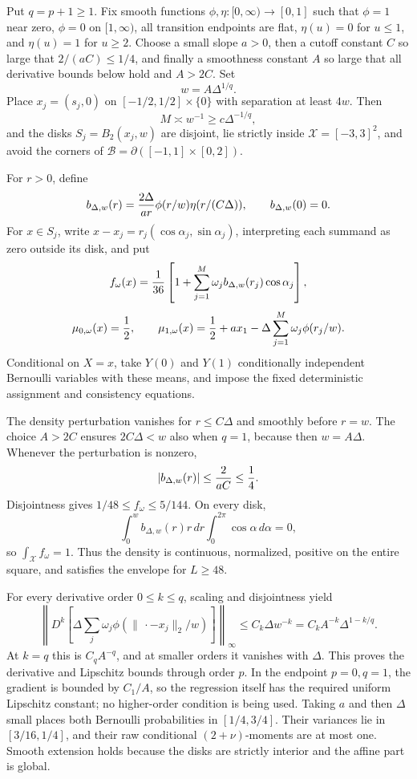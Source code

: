 Put \(q=p+1\geq1\).  Fix smooth functions \(\phi,\eta:[0,\infty)\to[0,1]\) such that \(\phi=1\) near zero, \(\phi=0\) on \([1,\infty)\), all transition endpoints are flat, \(\eta(u)=0\) for \(u\leq1\), and \(\eta(u)=1\) for \(u\geq2\).  Choose a small slope \(a>0\), then a cutoff constant \(C\) so large that \(2/(aC)\leq1/4\), and finally a smoothness constant \(A\) so large that all derivative bounds below hold and \(A>2C\).  Set
\[
 w=A\Delta^{1/q}.
\]
Place \(x_j=(s_j,0)\) on \([-1/2,1/2]\times\{0\}\) with separation at least \(4w\).  Then
\[
 M\asymp w^{-1}\geq c\Delta^{-1/q},
\]
and the disks \(S_j=B_2(x_j,w)\) are disjoint, lie strictly inside \(\mathcal X=[-3,3]^2\), and avoid the corners of \(\mathcal B=\partial([-1,1]\times[0,2])\).

For \(r>0\), define
\[
 b_{\Delta,w}(r)={2\Delta\over ar}\phi(r/w)\eta(r/(C\Delta)),
 \qquad b_{\Delta,w}(0)=0.
\]
For \(x\in S_j\), write \(x-x_j=r_j(\cos\alpha_j,\sin\alpha_j)\), interpreting each summand as zero outside its disk, and put
\[
 f_\omega(x)={1\over36}\left[1+\sum_{j=1}^M\omega_jb_{\Delta,w}(r_j)\cos\alpha_j\right],
\]
\[
 \mu_{0,\omega}(x)={1\over2},
 \qquad
 \mu_{1,\omega}(x)={1\over2}+ax_1-\Delta\sum_{j=1}^M\omega_j\phi(r_j/w).
\]
Conditional on \(X=x\), take \(Y(0)\) and \(Y(1)\) conditionally independent Bernoulli variables with these means, and impose the fixed deterministic assignment and consistency equations.

The density perturbation vanishes for \(r\leq C\Delta\) and smoothly before \(r=w\).  The choice \(A>2C\) ensures \(2C\Delta<w\) also when \(q=1\), because then \(w=A\Delta\).  Whenever the perturbation is nonzero,
\[
 |b_{\Delta,w}(r)|\leq {2\over aC}\leq{1\over4}.
\]
Disjointness gives \(1/48\leq f_\omega\leq5/144\).  On every disk,
\[
 \int_0^w b_{\Delta,w}(r)r\,dr\int_0^{2\pi}\cos\alpha\,d\alpha=0,
\]
so \(\int_{\mathcal X}f_\omega=1\).  Thus the density is continuous, normalized, positive on the entire square, and satisfies the envelope for \(L\geq48\).

For every derivative order \(0\leq k\leq q\), scaling and disjointness yield
\[
 \left\|D^k\left[\Delta\sum_j\omega_j
 \phi(\|\,\cdot-x_j\|_2/w)\right]\right\|_\infty
 \leq C_k\Delta w^{-k}=C_kA^{-k}\Delta^{1-k/q}.
\]
At \(k=q\) this is \(C_qA^{-q}\), and at smaller orders it vanishes with \(\Delta\).  This proves the derivative and Lipschitz bounds through order \(p\).  In the endpoint \(p=0,q=1\), the gradient is bounded by \(C_1/A\), so the regression itself has the required uniform Lipschitz constant; no higher-order condition is being used.  Taking \(a\) and then \(\Delta\) small places both Bernoulli probabilities in \([1/4,3/4]\).  Their variances lie in \([3/16,1/4]\), and their raw conditional \((2+\nu)\)-moments are at most one.  Smooth extension holds because the disks are strictly interior and the affine part is global.

